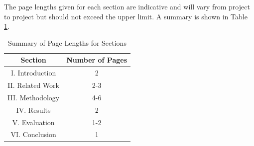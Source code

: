 \documentclass[10pt,journal,compsoc]{IEEEtran}
\begin{document}
The page lengths given for each section are indicative and will vary from project to project but should not exceed the upper limit. A summary is shown in Table \ref{table_2}.

\begin{table}[!t]
\renewcommand{\arraystretch}{1.3}
\caption{Summary of Page Lengths for Sections}
\label{table_2}
\centering
\begin{tabular}{cc}
\hline\hline
Section & Number of Pages\\
\hline
I. Introduction & 2\\
II. Related Work & 2-3\\
III. Methodology & 4-6\\
IV. Results & 2\\
V. Evaluation & 1-2\\
VI. Conclusion & 1\\
\hline\hline
\end{tabular}
\end{table}




%
%
%

\newpage




\end{document}
